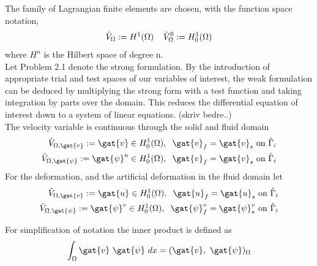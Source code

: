 The family of Lagrangian finite elements are chosen, with the function space notation,
\begin{align*}
\hat{V}_{\Omega} := H^1(\Omega) \hspace{4mm} 
\hat{V}_{\Omega}^0 := H_0^1(\Omega)  
\end{align*}
where $H^n$ is the Hilbert space of degree n. \\
Let Problem 2.1 denote the strong formulation. By the introduction of appropriate trial and test spaces of our variables of interest, the weak formulation can be deduced by multiplying the strong form with a test function and taking integration by parts over the domain.  This reduces the differential equation of interest down to a system of linear equations. (skriv bedre..) \\
The velocity variable is continuous through the solid and fluid domain
\begin{align*}
\hat{V}_{\Omega, \gat{v}} := \gat{v} \in H_0^1(\Omega), \hspace{2mm} 
\gat{v}_f = \gat{v}_s \ \text{on} \ \hat{\Gamma}_i \\
\hat{V}_{\Omega, \gat{\psi}} := \gat{\psi}^u \in H_0^1(\Omega), \hspace{2mm} 
\gat{v}_f = \gat{v}_s \ \text{on} \ \hat{\Gamma}_i 
\end{align*}
For the deformation, and the artificial deformation in the fluid domain let
\begin{align*}
\hat{V}_{\Omega, \gat{v}} := \gat{u} \in H_0^1(\Omega), \hspace{2mm} 
\gat{u}_f = \gat{u}_s \ \text{on} \ \hat{\Gamma}_i \\
\hat{V}_{\Omega, \gat{\psi}} := \gat{\psi}^v \in H_0^1(\Omega), \hspace{2mm} 
\gat{\psi}_f^v = \gat{\psi}_s^v \ \text{on} \ \hat{\Gamma}_i 
\end{align*}

For simplification of notation the inner product is defined as
\begin{align*}
\int_{\Omega} \gat{v} \ \gat{\psi} \ dx = (\gat{v}, \ \gat{\psi})_{\Omega}
\end{align*}
 

